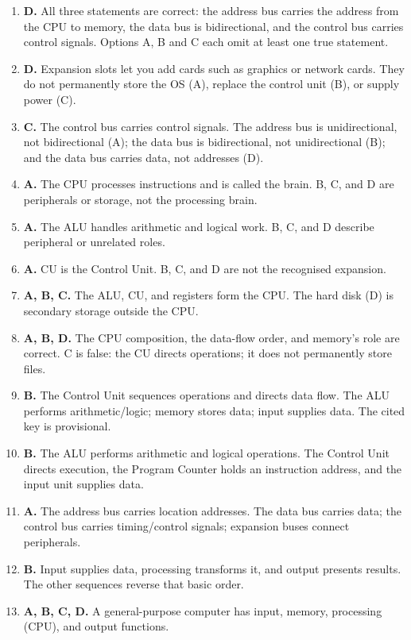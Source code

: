 \begin{enumerate}[label=\textbf{Q\arabic*.}, leftmargin=*]
\item \textbf{D.} All three statements are correct: the address bus carries
  the address from the CPU to memory, the data bus is bidirectional, and the
  control bus carries control signals. Options A, B and C each omit at least
  one true statement.
\item \textbf{D.} Expansion slots let you add cards such as graphics or
  network cards. They do not permanently store the OS (A), replace the
  control unit (B), or supply power (C).
\item \textbf{C.} The control bus carries control signals. The address bus is
  unidirectional, not bidirectional (A); the data bus is bidirectional, not
  unidirectional (B); and the data bus carries data, not addresses (D).

\item \textbf{A.} The CPU processes instructions and is called the brain. B, C, and D are peripherals or storage, not the processing brain.
\item \textbf{A.} The ALU handles arithmetic and logical work. B, C, and D describe peripheral or unrelated roles.
\item \textbf{A.} CU is the Control Unit. B, C, and D are not the recognised expansion.
\item \textbf{A, B, C.} The ALU, CU, and registers form the CPU. The hard disk (D) is secondary storage outside the CPU.
\item \textbf{A, B, D.} The CPU composition, the data-flow order, and memory's role are correct. C is false: the CU directs operations; it does not permanently store files.
\item \textbf{B.} The Control Unit sequences operations and directs data flow. The ALU performs arithmetic/logic; memory stores data; input supplies data. The cited key is provisional.

\item \textbf{B.} The ALU performs arithmetic and logical operations. The Control Unit directs execution, the Program Counter holds an instruction address, and the input unit supplies data.

\item \textbf{A.} The address bus carries location addresses. The data bus carries data; the control bus carries timing/control signals; expansion buses connect peripherals.

\item \textbf{B.} Input supplies data, processing transforms it, and output presents results. The other sequences reverse that basic order.

\item \textbf{A, B, C, D.} A general-purpose computer has input, memory, processing (CPU), and output functions.

\end{enumerate}

